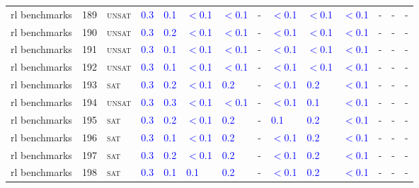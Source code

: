 \begin{center}
{\begin{longtable}{@{}llllllllllllll@{}}
rl benchmarks & 189 & \textsc{unsat} & \textcolor{blue}{0.3} & \textcolor{blue}{0.1} & \textcolor{blue}{$<$0.1} & \textcolor{blue}{$<$0.1} & - & \textcolor{blue}{$<$0.1} & \textcolor{blue}{$<$0.1} & \textcolor{blue}{$<$0.1} & - & - & - \\
rl benchmarks & 190 & \textsc{unsat} & \textcolor{blue}{0.3} & \textcolor{blue}{0.2} & \textcolor{blue}{$<$0.1} & \textcolor{blue}{$<$0.1} & - & \textcolor{blue}{$<$0.1} & \textcolor{blue}{$<$0.1} & \textcolor{blue}{$<$0.1} & - & - & - \\
rl benchmarks & 191 & \textsc{unsat} & \textcolor{blue}{0.3} & \textcolor{blue}{0.1} & \textcolor{blue}{$<$0.1} & \textcolor{blue}{$<$0.1} & - & \textcolor{blue}{$<$0.1} & \textcolor{blue}{$<$0.1} & \textcolor{blue}{$<$0.1} & - & - & - \\
rl benchmarks & 192 & \textsc{unsat} & \textcolor{blue}{0.3} & \textcolor{blue}{0.1} & \textcolor{blue}{$<$0.1} & \textcolor{blue}{$<$0.1} & - & \textcolor{blue}{$<$0.1} & \textcolor{blue}{$<$0.1} & \textcolor{blue}{$<$0.1} & - & - & - \\
rl benchmarks & 193 & \textsc{sat} & \textcolor{blue}{0.3} & \textcolor{blue}{0.2} & \textcolor{blue}{$<$0.1} & \textcolor{blue}{0.2} & - & \textcolor{blue}{$<$0.1} & \textcolor{blue}{0.2} & \textcolor{blue}{$<$0.1} & - & - & - \\
rl benchmarks & 194 & \textsc{unsat} & \textcolor{blue}{0.3} & \textcolor{blue}{0.3} & \textcolor{blue}{$<$0.1} & \textcolor{blue}{$<$0.1} & - & \textcolor{blue}{$<$0.1} & \textcolor{blue}{0.1} & \textcolor{blue}{$<$0.1} & - & - & - \\
rl benchmarks & 195 & \textsc{sat} & \textcolor{blue}{0.3} & \textcolor{blue}{0.2} & \textcolor{blue}{$<$0.1} & \textcolor{blue}{0.2} & - & \textcolor{blue}{0.1} & \textcolor{blue}{0.2} & \textcolor{blue}{$<$0.1} & - & - & - \\
rl benchmarks & 196 & \textsc{sat} & \textcolor{blue}{0.3} & \textcolor{blue}{0.1} & \textcolor{blue}{$<$0.1} & \textcolor{blue}{0.2} & - & \textcolor{blue}{$<$0.1} & \textcolor{blue}{0.2} & \textcolor{blue}{$<$0.1} & - & - & - \\
rl benchmarks & 197 & \textsc{sat} & \textcolor{blue}{0.3} & \textcolor{blue}{0.2} & \textcolor{blue}{$<$0.1} & \textcolor{blue}{0.2} & - & \textcolor{blue}{$<$0.1} & \textcolor{blue}{0.2} & \textcolor{blue}{$<$0.1} & - & - & - \\
rl benchmarks & 198 & \textsc{sat} & \textcolor{blue}{0.3} & \textcolor{blue}{0.1} & \textcolor{blue}{0.1} & \textcolor{blue}{0.2} & - & \textcolor{blue}{$<$0.1} & \textcolor{blue}{0.2} & \textcolor{blue}{$<$0.1} & - & - & - \\

\end{longtable}}
\end{center}
